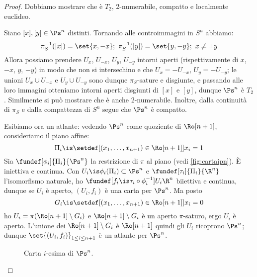 \begin{proof}
	Dobbiamo mostrare che è $T_2$, 2-numerabile, compatto e localmente euclideo.

	Siano $[x], [y] \in \Ps^n$ distinti. Tornando alle controimmagini in $S^n$ abbiamo:
	\[\pi_S^{-1}([x]) = \set{x, -x}; \
	\pi_S^{-1}([y]) = \set{y, -y}; \
	x \neq \pm y \]
	Allora possiamo prendere $U_x$, $U_{-x}$, $U_y$, $U_{-y}$ intorni aperti 
	(rispettivamente di $x$, $-x$, $y$, $-y$)
	in modo che non si intersechino e che $U_x = -U_{-x}$, $U_y = -U_{-y}$;
	le unioni $U_x \cup U_{-x}$ e $U_y \cup U_{-y}$ sono dunque $\pi_S$-sature e disgiunte,
	e passando alle loro immagini otteniamo intorni aperti disgiunti di $[x]$ e $[y]$,
	dunque $\Ps^n$ è $T_2$.
	Similmente si può mostrare che è anche 2-numerabile.
	Inoltre, dalla continuità di $\pi_S$ e dalla compattezza di $S^n$ segue che $\Ps^n $ è compatto.

	Esibiamo ora un atlante: vedendo $\Ps^n$ come quoziente di $\Ro[n+1]$,
	consideriamo il piano affine:
	\[ \Pi_i\is\setdef[(x_1, \dots, x_{n+1})\in {\Ro[n+1]}]{x_i = 1} \]
	Sia $\fundef[\phi_i]{\Pi_i}{\Ps^n}$ la restrizione di $\pi$ al piano (vedi \autoref{fig:cartaipn}).
	È iniettiva e continua.
	Con $U_i \is \phi_i(\Pi_i) \subset \Ps^n$ e $\fundef[\tau_i]{\Pi_i}{\R^n}$ l'isomorfismo naturale,
	ho $\fundef[f_i \is \tau_i \circ \phi_i^{-1}]{U_i}{\R^n}$ biiettiva e continua,
	dunque se $U_i$ è aperto, $(U_i, f_i)$ è una carta per $\Ps^n$. Ma posto
	\[ G_i \is \setdef[(x_1, \dots, x_{n+1})\in {\Ro[n+1]}]{x_i = 0} \]
	ho $U_i = \pi(\Ro[n+1] \setminus G_i)$ e $\Ro[n+1] \setminus G_i$ è un aperto $\pi$-saturo,
	ergo $U_i$ è aperto.
	L'unione dei $\Ro[n+1]\setminus G_i$ è $\Ro[n+1]$ quindi gli $U_i$ ricoprono $\Ps^n$;
	dunque $\set{(U_i, f_i)}_{1 \leq i \leq n+1}$ è un atlante per $\Ps^n$.
	\begin{figure}
		\centering
		\caption{Carta $i$-esima di $\Ps^n$.}
		\label{fig:cartaipn}
	\end{figure}
\end{proof}

